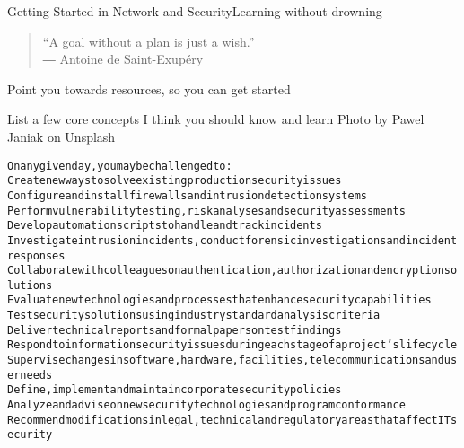 \documentclass[Screen16to9,17pt]{foils}
\begin{document}
{}

\mytitlepage
{Getting Started in Network and Security}{Learning without drowning}

\hlkprofiluk




\begin{quote}
  “A goal without a plan is just a wish.”\\
  ― Antoine de Saint-Exupéry
\end{quote}




\begin{list1}
\item Point you towards resources, so you can get started
\item List a few core concepts I think you should know and learn
\hskip 2cm {\footnotesize Photo by Pawel Janiak on Unsplash}
\end{list1}








\begin{alltt}\small
On any given day, you may be challenged to:
        Create new ways to solve existing production security issues
        Configure and install firewalls and intrusion detection systems
        Perform vulnerability testing, risk analyses and security assessments
        Develop automation scripts to handle and track incidents
        Investigate intrusion incidents, conduct forensic investigations and incident responses
        Collaborate with colleagues on authentication, authorization and encryption solutions
        Evaluate new technologies and processes that enhance security capabilities
        Test security solutions using industry standard analysis criteria
        Deliver technical reports and formal papers on test findings
        Respond to information security issues during each stage of a project’s lifecycle
        Supervise changes in software, hardware, facilities, telecommunications and user needs
        Define, implement and maintain corporate security policies
        Analyze and advise on new security technologies and program conformance
        Recommend modifications in legal, technical and regulatory areas that affect IT security
\end{alltt}
\end{document}
